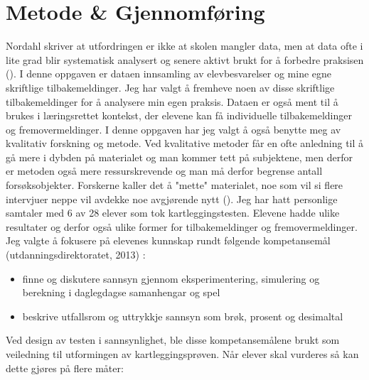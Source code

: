 \documentclass[main.tex]{subfiles}
\begin{document}
\section*{Metode \& Gjennomføring}
\label{sec:2}
Nordahl skriver at utfordringen er ikke at skolen mangler data, men at data ofte i lite grad blir
systematisk analysert og senere aktivt brukt for å forbedre praksisen ().
I denne oppgaven er dataen innsamling av elevbesvarelser og mine egne skriftlige tilbakemeldinger.
Jeg har valgt å fremheve noen av disse skriftlige tilbakemeldinger for å analysere min egen praksis.
Dataen er også ment til å brukes i læringsrettet kontekst, der elevene kan få
individuelle tilbakemeldinger og fremovermeldinger. 
\newline
\newline
I denne oppgaven har jeg valgt å også benytte meg av kvalitativ forskning og metode. Ved
kvalitative metoder får en ofte anledning til å gå mere i dybden på materialet og man kommer
tett på subjektene, men derfor er metoden også mere ressurskrevende og man må derfor
begrense antall forsøksobjekter. Forskerne kaller det å "mette" materialet, noe som vil si 
flere intervjuer neppe vil avdekke noe avgjørende nytt (). Jeg har hatt
personlige samtaler med 6 av 28 elever som tok kartleggingstesten. Elevene hadde ulike
resultater og derfor også ulike former for tilbakemeldinger og fremovermeldinger.
\newline
\newline
Jeg valgte å fokusere på elevenes kunnskap rundt følgende kompetansemål (utdanningsdirektoratet, 2013) :
\begin{itemize}
\item finne og diskutere sannsyn gjennom eksperimentering, simulering og berekning i daglegdagse samanhengar og spel
\item beskrive utfallsrom og uttrykkje sannsyn som brøk, prosent og desimaltal
\end{itemize}
Ved design av testen i sannsynlighet, ble disse kompetansemålene brukt som veiledning til
utformingen av kartleggingsprøven.
\newline
\newline
Når elever skal vurderes så kan dette gjøres på flere måter:
\end{document}
